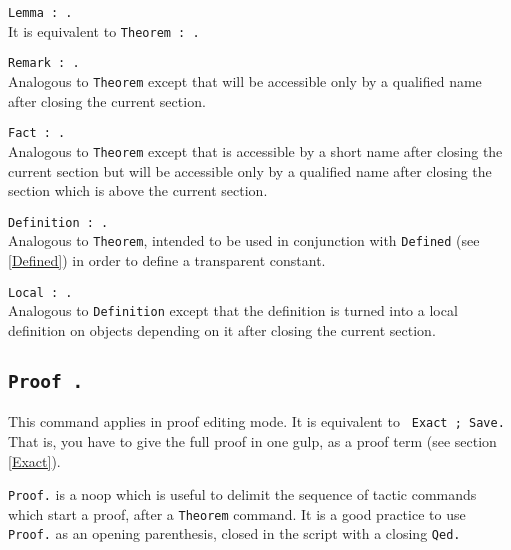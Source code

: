 \begin{Variants}
\item {\tt Lemma {\ident} : {\form}.}\\
  It is equivalent to {\tt Theorem {\ident} : {\form}.}
\item {\tt Remark {\ident} : {\form}.}\\
  Analogous to {\tt Theorem} except that {\ident} will be accessible
  only by a qualified name after closing the current section.
\item {\tt Fact {\ident} : {\form}.}\\
  Analogous to {\tt Theorem} except that {\ident} is accessible by a
  short name after closing the current section but 
  will be accessible only by a qualified name after closing the
  section which is above the current section. 
\item {\tt Definition {\ident} : {\form}.}
\\
  Analogous to {\tt Theorem}, intended to be used in conjunction with
  {\tt Defined} (see \ref{Defined}) in order to define a
  transparent constant.
\item {\tt Local {\ident} : {\form}.}
\\
  Analogous to {\tt Definition} except that the definition is turned
  into a local definition on objects depending on it after closing the
  current section.
\end{Variants}

\subsection{\tt Proof {\term}.}
This command applies in proof editing mode. It is equivalent to {\tt
  Exact {\term}; Save.} That is, you have to give the full proof in
one gulp, as a proof term (see section \ref{Exact}).

\begin{Variants}
\item{\tt Proof.} is a noop which is useful to delimit the sequence of
tactic commands which start a proof, after a {\tt Theorem} command.
It is a good practice to use {\tt Proof.} as an opening parenthesis,
closed in the script with a closing {\tt Qed.}
\end{Variants}


